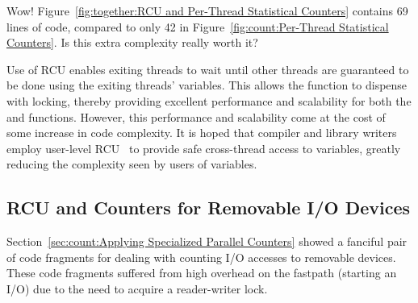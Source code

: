 \QuickQuiz{}
	Wow!
	Figure~\ref{fig:together:RCU and Per-Thread Statistical Counters}
	contains 69 lines of code, compared to only 42 in
	Figure~\ref{fig:count:Per-Thread Statistical Counters}.
	Is this extra complexity really worth it?
 \QuickQuizEnd

Use of RCU enables exiting threads to wait until other threads are
guaranteed to be done using the exiting threads'  variables.
This allows the  function to dispense with locking,
thereby providing
excellent performance and scalability for both the 
and  functions.
However, this performance and scalability come at the cost of some increase
in code complexity.
It is hoped that compiler and library writers employ user-level
RCU~\cite{MathieuDesnoyers2009URCU} to provide safe cross-thread
access to  variables, greatly reducing the
complexity seen by users of  variables.

\subsection{RCU and Counters for Removable I/O Devices}
\label{sec:together:RCU and Counters for Removable I/O Devices}

Section~\ref{sec:count:Applying Specialized Parallel Counters}
showed a fanciful pair of code fragments for dealing with counting
I/O accesses to removable devices.
These code fragments suffered from high overhead on the fastpath
(starting an I/O) due to the need to acquire a reader-writer
lock.


